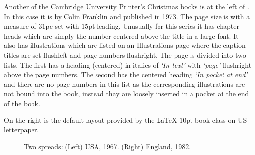 \documentclass[10pt,a4paper,extrafontsizes]{memoir}
\begin{document}
\begin{paracol}{2}
\switchEng
    Another of the Cambridge University 
Printer's Christmas books 
is at the left
of . In this case it is  by Colin Franklin and published in 1973. The
page size is  with a measure of $31$pc set with
$15$pt leading.  Unusually for this series it has chapter 
heads which are simply the number centered above 
the title in a large font. It also has illustrations
which are listed on an Illustrations page where the caption
titles are set flushleft and page numbers flushright. The page is divided
into two lists. The first has a heading (centered) in italics of
\textit{`In text'} with \textit{`page'} flushright above the page numbers.
The second has the centered heading \textit{`In pocket at end'} and there
are no page numbers in this list as the corresponding illustrations
are not bound into the book, instead thay are loosely inserted in a 
pocket at the end of the book.

On the right is the default layout provided by the
LaTeX $10$pt book class on US letterpaper.
\end{paracol}

\begin{figure}
\centering
\begin{minipage}[b]{\pwlayi}
\end{minipage}
\hfill
\begin{minipage}[b]{\pwlayi}
\end{minipage}
\caption[Two spreads: USA, 1967 and England, 1982]%
        {Two spreads: (Left) USA, 1967.
         (Right) England, 1982.} \label{fb:14}
\end{figure}
\end{document}
